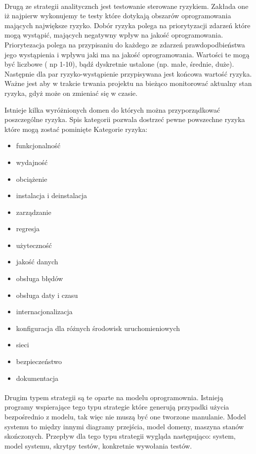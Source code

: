\paragraph{}
Drugą ze strategii analitycznch jest testowanie sterowane ryzykiem. Zakłada one iż najpierw wykonujemy te testy które dotykają obszarów oprogramowania mających największe ryzyko.  Dobór ryzyka polega na priorytyzacji zdarzeń które mogą wystąpić, mających negatywny wpływ na jakość oprogramowania.
Priorytezacja polega na przypisaniu do każdego ze zdarzeń prawdopodbieństwa jego wystąpienia i wpływu jaki ma na jakość oprogramowania. Wartości te mogą być liczbowe ( np 1-10), bądź dyskretnie ustalone (np. małe, średnie, duże). Następnie dla par ryzyko-wystąpienie przypisywana jest końcowa wartość ryzyka. Ważne jest aby w trakcie trwania projektu na bieżąco monitorować aktualny stan ryzyka, gdyż może on zmieniać się w czasie.

Istnieje kilka wyróżnionych domen do których można przyporządkować poszczególne ryzyka. Spis kategorii pozwala dostrzeć pewne powszechne ryzyka które mogą zostać pominięte
Kategorie ryzyka:
\begin{itemize}
  \item funkcjonalność
  \item wydajność
  \item obciążenie
  \item instalacja i deinstalacja
  \item zarządzanie
  \item regresja
  \item użyteczność
  \item jakość danych
  \item obsługa błędów
  \item obsługa daty i czasu
  \item internacjonalizacja
  \item konfiguracja dla różnych środowisk uruchomieniowych
  \item sieci
  \item bezpieczeństwo
  \item dokumentacja
\end{itemize}

\paragraph{}
Drugim typem strategii są te oparte na modelu oprogramownia.  Istnieją programy wspierające tego typu strategie które generują przypadki użycia bezpośrednio z modelu, tak więc nie muszą być one tworzone manulanie.
Model systemu to między innymi diagramy przejścia, model domeny, maszyna stanów skończonych. Przepływ dla tego typu strategii wygląda następująco: system, model systemu, skrytpy testów, konkretnie wywołania testów.
